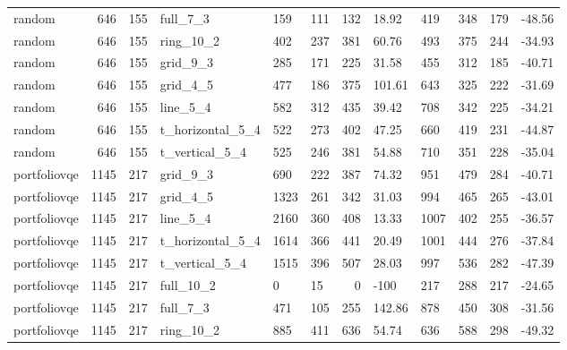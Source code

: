 \begin{longtable}{lrrlllrlllrl}
random & 646 & 155 & full\_7\_3 & 159 & 111 & 132 & 18.92 & 419 & 348 & 179 & -48.56 \\
random & 646 & 155 & ring\_10\_2 & 402 & 237 & 381 & 60.76 & 493 & 375 & 244 & -34.93 \\
random & 646 & 155 & grid\_9\_3 & 285 & 171 & 225 & 31.58 & 455 & 312 & 185 & -40.71 \\
random & 646 & 155 & grid\_4\_5 & 477 & 186 & 375 & 101.61 & 643 & 325 & 222 & -31.69 \\
random & 646 & 155 & line\_5\_4 & 582 & 312 & 435 & 39.42 & 708 & 342 & 225 & -34.21 \\
random & 646 & 155 & t\_horizontal\_5\_4 & 522 & 273 & 402 & 47.25 & 660 & 419 & 231 & -44.87 \\
random & 646 & 155 & t\_vertical\_5\_4 & 525 & 246 & 381 & 54.88 & 710 & 351 & 228 & -35.04 \\
portfoliovqe & 1145 & 217 & grid\_9\_3 & 690 & 222 & 387 & 74.32 & 951 & 479 & 284 & -40.71 \\
portfoliovqe & 1145 & 217 & grid\_4\_5 & 1323 & 261 & 342 & 31.03 & 994 & 465 & 265 & -43.01 \\
portfoliovqe & 1145 & 217 & line\_5\_4 & 2160 & 360 & 408 & 13.33 & 1007 & 402 & 255 & -36.57 \\
portfoliovqe & 1145 & 217 & t\_horizontal\_5\_4 & 1614 & 366 & 441 & 20.49 & 1001 & 444 & 276 & -37.84 \\
portfoliovqe & 1145 & 217 & t\_vertical\_5\_4 & 1515 & 396 & 507 & 28.03 & 997 & 536 & 282 & -47.39 \\
portfoliovqe & 1145 & 217 & full\_10\_2 & 0 & 15 & 0 & -100 & 217 & 288 & 217 & -24.65 \\
portfoliovqe & 1145 & 217 & full\_7\_3 & 471 & 105 & 255 & 142.86 & 878 & 450 & 308 & -31.56 \\
portfoliovqe & 1145 & 217 & ring\_10\_2 & 885 & 411 & 636 & 54.74 & 636 & 588 & 298 & -49.32 \\
\end{longtable}

